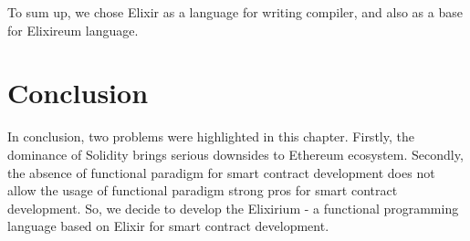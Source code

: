 To sum up, we chose Elixir as a language for writing compiler, and also as a base for Elixireum language.

\section{Conclusion}
\label{sec:conc}

In conclusion, two problems were highlighted in this chapter. Firstly, the dominance of Solidity brings serious downsides to Ethereum ecosystem. Secondly, the absence of functional paradigm for smart contract development does not allow the usage of functional paradigm strong pros for smart contract development. So, we decide to develop the Elixirium - a functional programming language based on Elixir for smart contract development.
